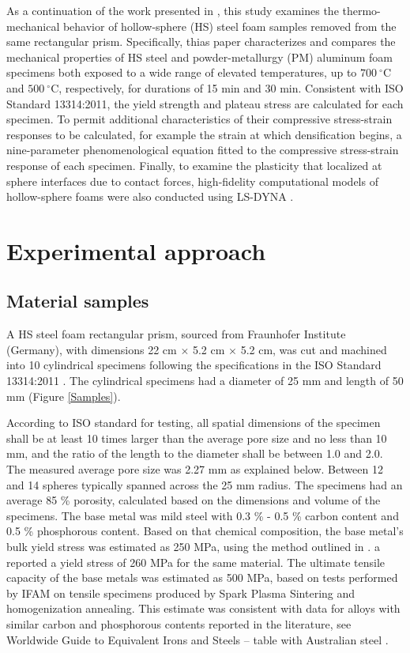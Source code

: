 \documentclass[review]{elsarticle}
\begin{document}
As a continuation of the work presented in \cite{Szyniszewskietal2014}, this study examines the thermo-mechanical behavior of hollow-sphere (HS) steel foam samples removed from the same rectangular prism. Specifically, thias paper characterizes and compares the mechanical properties of HS steel and powder-metallurgy (PM) aluminum foam specimens both exposed to a wide range of elevated temperatures, up to $700~^{\circ}\mathrm{C}$ and $500~^{\circ}\mathrm{C}$, respectively, for durations of 15 min and 30 min. Consistent with ISO Standard 13314:2011, the yield strength and plateau stress are calculated for each specimen. To permit additional characteristics of their compressive stress-strain responses to be calculated, for example the strain at which densification begins, a nine-parameter phenomenological equation fitted to the compressive stress-strain response of each specimen. Finally, to examine the plasticity that localized at sphere interfaces due to contact forces, high-fidelity computational models of hollow-sphere foams were also conducted using LS-DYNA \cite{hallquist_ls-dyna_2006}.

\section{Experimental approach}

\subsection*{Material samples}
A HS steel foam rectangular prism, sourced from Fraunhofer Institute (Germany), with dimensions 22 cm $\times$ 5.2 cm $\times$ 5.2 cm, was cut and machined into 10 cylindrical specimens following the specifications in the ISO Standard 13314:2011 \cite{ISO13314}. The cylindrical specimens had a diameter of 25 mm and length of 50 mm (Figure \ref{Samples}).

According to ISO standard for testing, all spatial dimensions of the specimen shall be at least 10 times larger than the average pore size and no less than 10 mm, and the ratio of the length to the diameter shall be between 1.0 and 2.0. The measured average pore size was 2.27 mm as explained below. Between 12 and 14 spheres typically spanned across the 25 mm radius. The specimens had an average 85 \% porosity, calculated based on the dimensions and volume of the specimens. The base metal was mild steel with 0.3 \% - 0.5 \% carbon content and 0.5 \% phosphorous content. Based on that chemical composition, the base metal’s bulk yield stress was estimated as 250 MPa, using the method outlined in \cite{Cobb1987}. \cite{Smith2012} a reported a yield stress of 260 MPa for the same material. The ultimate tensile capacity of the base metals was estimated as 500 MPa, based on tests performed by IFAM on tensile specimens produced by Spark Plasma Sintering and homogenization annealing. This estimate was consistent with data for alloys with similar carbon and phosphorous contents reported in the literature, see Worldwide Guide to Equivalent Irons and Steels – table with Australian steel \cite{Cobb1987}.
\end{document}
